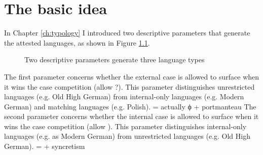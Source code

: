 
\chapter{The basic idea}\label{ch:the-basic-idea}

In Chapter \ref{ch:typology} I introduced two descriptive parameters that generate the attested languages, as shown in Figure \ref{fig:two-parameters}.

\begin{figure}[htbp]
  \centering
    \footnotesize{
    }
    \caption{Two descriptive parameters generate three language types}
    \label{fig:two-parameters}
\end{figure}

The first parameter concerns whether the external case is allowed to surface when it wins the case competition (allow ?). This parameter distinguishes unrestricted languages (e.g. Old High German) from internal-only languages (e.g. Modern German) and matching languages (e.g. Polish). = actually ϕ +  portmanteau
The second parameter concerns whether the internal case is allowed to surface when it wins the case competition (allow ). This parameter distinguishes internal-only languages (e.g. as Modern German) from unrestricted languages (e.g. Old High German). =  +  syncretism

